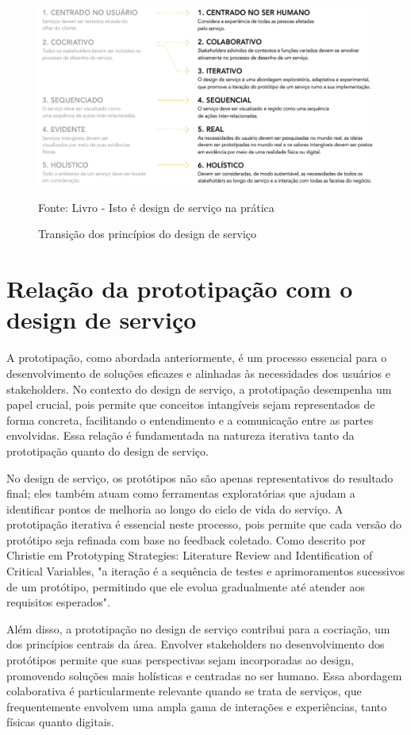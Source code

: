 \begin{figure}[h]
	\centering %
	\includegraphics[width=15cm]{figuras/principios.png} %
	\caption{Transição dos princípios do design de serviço}
	Fonte: Livro - Isto é design de serviço na prática
	\label{figura:qualquernome}
\end{figure}

\section{Relação da prototipação com o design de serviço}

A prototipação, como abordada anteriormente, é um processo essencial para o desenvolvimento de soluções eficazes e alinhadas às necessidades dos usuários e stakeholders. No contexto do design de serviço, a prototipação desempenha um papel crucial, pois permite que conceitos intangíveis sejam representados de forma concreta, facilitando o entendimento e a comunicação entre as partes envolvidas. Essa relação é fundamentada na natureza iterativa tanto da prototipação quanto do design de serviço.

No design de serviço, os protótipos não são apenas representativos do resultado final; eles também atuam como ferramentas exploratórias que ajudam a identificar pontos de melhoria ao longo do ciclo de vida do serviço. A prototipação iterativa é essencial neste processo, pois permite que cada versão do protótipo seja refinada com base no feedback coletado. Como descrito por Christie em Prototyping Strategies: Literature Review and Identification of Critical Variables, "a iteração é a sequência de testes e aprimoramentos sucessivos de um protótipo, permitindo que ele evolua gradualmente até atender aos requisitos esperados"\cite{Christie2012}.

Além disso, a prototipação no design de serviço contribui para a cocriação, um dos princípios centrais da área. Envolver stakeholders no desenvolvimento dos protótipos permite que suas perspectivas sejam incorporadas ao design, promovendo soluções mais holísticas e centradas no ser humano. Essa abordagem colaborativa é particularmente relevante quando se trata de serviços, que frequentemente envolvem uma ampla gama de interações e experiências, tanto físicas quanto digitais.

